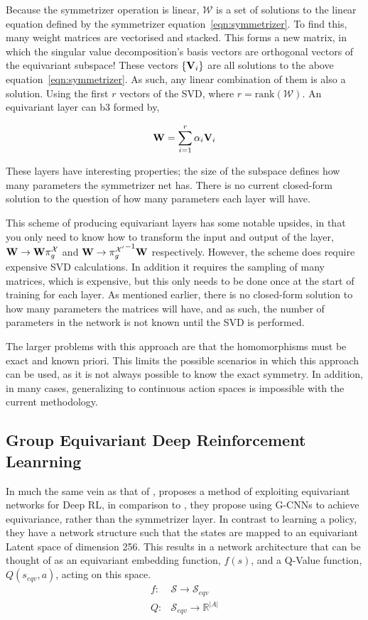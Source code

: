 Because the symmetrizer operation is linear, $\mathcal{W}$ is a set of solutions to the linear equation defined by the symmetrizer equation~\ref{eqn:symmetrizer}. To find this, many weight matrices are vectorised and stacked. This forms a new matrix, in which the singular value decomposition's basis vectors are orthogonal vectors of the equivariant subspace! These vectors $\{\mathbf{V}_i\}$ are all solutions to the above equation~\ref{eqn:symmetrizer}. As such, any linear combination of them is also a solution. Using the first $r$ vectors of the SVD, where $r= \text{rank}(\mathcal{W})$. An equivariant layer can b3 formed by,

\begin{equation}
	\mathbf{W} = \sum_{i=1}^{r}{\alpha_i\mathbf{V}_i}
\end{equation}

These layers have interesting properties; the size of the subspace defines how many parameters the symmetrizer net has. There is no current closed-form solution to the question of how many parameters each layer will have.

This scheme of producing equivariant layers has some notable upsides, in that you only need to know how to transform the input and output of the layer, $\mathbf{W} \rightarrow \mathbf{W}\pi_g^\mathcal{X}$ and $\mathbf{W} \rightarrow {\pi_g^{\mathcal{X}'}}^{-1} \mathbf{W}$ respectively. However, the scheme does require expensive SVD calculations. In addition it requires the sampling of many matrices, which is expensive, but this only needs to be done once at the start of training for each layer. As mentioned earlier, there is no closed-form solution to how many parameters the matrices will have, and as such, the number of parameters in the network is not known until the SVD is performed.

The larger problems with this approach are that the homomorphisms must be exact and known priori. This limits the possible scenarios in which this approach can be used, as it is not always possible to know the exact symmetry. In addition, in many cases, generalizing to continuous action spaces is impossible with the current methodology.


\subsection{Group Equivariant Deep Reinforcement Leanrning}
In much the same vein as that of \cite{vanderpol2020mdp}, \cite{mondal2020group} proposes a method of exploiting equivariant networks for Deep RL, in comparison to \cite{vanderpol2020mdp}, they propose using G-CNNs \cite{cohen2016group} to achieve equivariance, rather than the symmetrizer layer. In contrast to learning a policy, they have a network structure such that the states are mapped to an equivariant Latent space of dimension 256. This results in a network architecture that can be thought of as an equivariant embedding function, $f(s)$, and a Q-Value function, $Q(s_{eqv}, a)$, acting on this space.
\begin{align}
	f: & \mathcal{S} \rightarrow \mathcal{S}_{eqv}      \\
	Q: & \mathcal{S}_{eqv} \rightarrow \mathbb{R}^{|A|}
\end{align}

